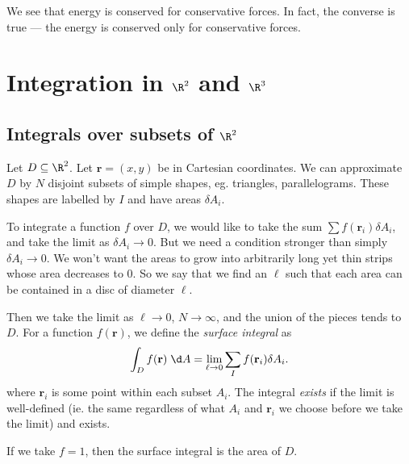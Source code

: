 \documentclass[a4paper]{article}
\begin{document}
We see that energy is conserved for conservative forces. In fact, the converse is true --- the energy is conserved only for conservative forces.

\section{Integration in \texorpdfstring{$\R^2$ and $\R^3$}{R2 and R3}}
\subsection{Integrals over subsets of \texorpdfstring{$\R^2$}{R2}}
\begin{defi}
  Let $D\subseteq \R^2$. Let $\mathbf{r} = (x, y)$ be in Cartesian coordinates. We can approximate $D$ by $N$ disjoint subsets of simple shapes, eg. triangles, parallelograms. These shapes are labelled by $I$ and have areas $\delta A_i$. \begin{center}
  \end{center}
  To integrate a function $f$ over $D$, we would like to take the sum $\sum f(\mathbf{r}_i) \delta A_i$, and take the limit as $\delta A_i \to 0$. But we need a condition stronger than simply $\delta A_i \to 0$. We won't want the areas to grow into arbitrarily long yet thin strips whose area decreases to 0. So we say that we find an $\ell$ such that each area can be contained in a disc of diameter $\ell$.

  Then we take the limit as $\ell \to 0$, $N\to \infty$, and the union of the pieces tends to $D$. For a function $f(\mathbf{r})$, we define the \emph{surface integral} as
  \[
    \int_D f(\mathbf{r}) \;\d A = \lim_{\ell\to 0}\sum _I f(\mathbf{r}_i)\delta A_i.
  \]
  where $\mathbf{r}_i$ is some point within each subset $A_i$. The integral \emph{exists} if the limit is well-defined (ie. the same regardless of what $A_i$ and $\mathbf{r}_i$ we choose before we take the limit) and exists.
\end{defi}
If we take $f = 1$, then the surface integral is the area of $D$.
\end{document}
